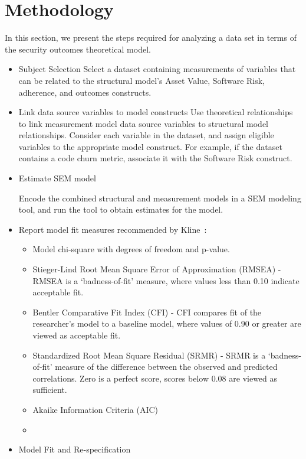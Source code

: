 \section{Methodology}
\label{sec:methodology}

In this section, we present the steps required for analyzing a data set in terms of the security outcomes theoretical model.
\begin{itemize}
\item Subject Selection
Select a dataset containing measurements of variables that can be related to the structural model's Asset Value, Software Risk, adherence, and outcomes constructs.  

\item Link data source variables to model constructs 
Use theoretical relationships to link measurement model data source variables to structural model relationships. Consider each variable in the dataset, and assign eligible variables to the appropriate model construct. For example, if the dataset contains a code churn metric, associate it with the Software Risk construct.
 
\item Estimate SEM model 

Encode the combined structural and measurement models in a SEM modeling tool, and run the tool to obtain estimates for the model.
\item Report model fit measures recommended by Kline~\cite{kline2015principles}:
\begin{itemize}
	\item Model chi-square with degrees of freedom and p-value.
	\item Stieger-Lind Root Mean Square Error of Approximation (RMSEA) - RMSEA is a `badness-of-fit' measure, where values less than 0.10 indicate acceptable fit.
	\item Bentler Comparative Fit Index (CFI) - CFI compares fit of the researcher's model to a baseline model, where values of 0.90 or greater are viewed as acceptable fit.
	\item Standardized Root Mean Square Residual (SRMR) - SRMR is a `badness-of-fit' measure of the difference between the observed and predicted correlations. Zero is a perfect score, scores below 0.08 are viewed as sufficient.
	\item Akaike Information Criteria (AIC)
	\item 
\end{itemize}

\item Model Fit and Re-specification


\end{itemize}
